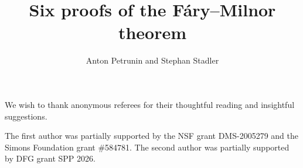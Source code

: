\documentclass{article}
\begin{document}
\newcommand{\amm}[2]{#2} 

\title{%
Six proofs of the Fáry--Milnor theorem}
\author{Anton Petrunin and Stephan Stadler}

\date{}
\maketitle









We wish to thank anonymous referees for their thoughtful reading and insightful suggestions.

The first author was partially supported by the NSF grant DMS-2005279 and the Simons Foundation grant \#584781.
The second author was partially supported by DFG grant SPP 2026.

\sloppy
\printbibliography[heading=bibintoc]
\fussy
\end{document}
